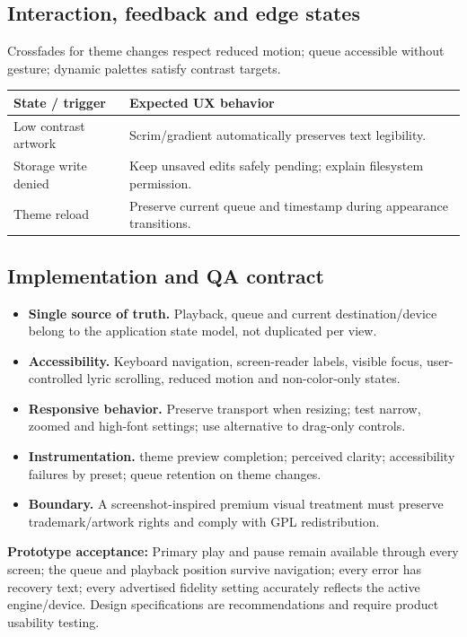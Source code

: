 \documentclass[10pt,a4paper,oneside]{report}
\begin{document}
\subsection*{Interaction, feedback and edge states}
Crossfades for theme changes respect reduced motion; queue accessible without gesture; dynamic palettes satisfy contrast targets.\par
\begin{tabularx}{\linewidth}{@{}p{39mm}X@{}}\toprule State / trigger & Expected UX behavior\\\midrule
Low contrast artwork & Scrim/gradient automatically preserves text legibility.\\
Storage write denied & Keep unsaved edits safely pending; explain filesystem permission.\\
Theme reload & Preserve current queue and timestamp during appearance transitions.\\
\bottomrule\end{tabularx}
\subsection*{Implementation and QA contract}
\begin{itemize}[leftmargin=*,itemsep=2pt,topsep=2pt]
\item \textbf{Single source of truth.} Playback, queue and current destination/device belong to the application state model, not duplicated per view.
\item \textbf{Accessibility.} Keyboard navigation, screen-reader labels, visible focus, user-controlled lyric scrolling, reduced motion and non-color-only states.
\item \textbf{Responsive behavior.} Preserve transport when resizing; test narrow, zoomed and high-font settings; use alternative to drag-only controls.
\item \textbf{Instrumentation.} theme preview completion; perceived clarity; accessibility failures by preset; queue retention on theme changes.
\item \textbf{Boundary.} A screenshot-inspired premium visual treatment must preserve trademark/artwork rights and comply with GPL redistribution.
\end{itemize}
\vspace{2mm}\begin{evidencebox}\small\textbf{Prototype acceptance:} Primary play and pause remain available through every screen; the queue and playback position survive navigation; every error has recovery text; every advertised fidelity setting accurately reflects the active engine/device. Design specifications are recommendations and require product usability testing.\end{evidencebox}
\clearpage
\end{document}
